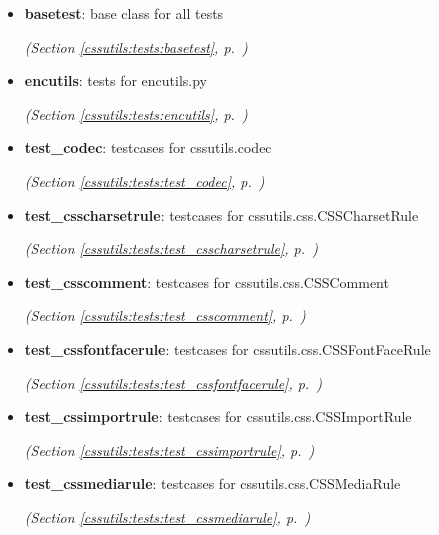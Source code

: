 \begin{itemize}
\setlength{\parskip}{0ex}
\item \textbf{basetest}: base class for all tests



  \textit{(Section \ref{cssutils:tests:basetest}, p.~\pageref{cssutils:tests:basetest})}

\item \textbf{encutils}: tests for encutils.py



  \textit{(Section \ref{cssutils:tests:encutils}, p.~\pageref{cssutils:tests:encutils})}

\item \textbf{test\_codec}: testcases for cssutils.codec



  \textit{(Section \ref{cssutils:tests:test_codec}, p.~\pageref{cssutils:tests:test_codec})}

\item \textbf{test\_csscharsetrule}: testcases for cssutils.css.CSSCharsetRule



  \textit{(Section \ref{cssutils:tests:test_csscharsetrule}, p.~\pageref{cssutils:tests:test_csscharsetrule})}

\item \textbf{test\_csscomment}: testcases for cssutils.css.CSSComment



  \textit{(Section \ref{cssutils:tests:test_csscomment}, p.~\pageref{cssutils:tests:test_csscomment})}

\item \textbf{test\_cssfontfacerule}: testcases for cssutils.css.CSSFontFaceRule



  \textit{(Section \ref{cssutils:tests:test_cssfontfacerule}, p.~\pageref{cssutils:tests:test_cssfontfacerule})}

\item \textbf{test\_cssimportrule}: testcases for cssutils.css.CSSImportRule



  \textit{(Section \ref{cssutils:tests:test_cssimportrule}, p.~\pageref{cssutils:tests:test_cssimportrule})}

\item \textbf{test\_cssmediarule}: testcases for cssutils.css.CSSMediaRule



  \textit{(Section \ref{cssutils:tests:test_cssmediarule}, p.~\pageref{cssutils:tests:test_cssmediarule})}


\end{itemize}
